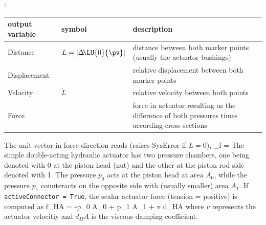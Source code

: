 :
\begin{center}
\footnotesize
\begin{longtable}{| p{5cm} | p{5cm} | p{6cm} |} 
\hline
\bf output variable & \bf symbol & \bf description \\ \hline
Distance & $L = |\Delta\! \LU{0}{\pv}|$ & distance between both marker points (usually the actuator bushings)\\ \hline
Displacement &  & relative displacement between both marker points\\ \hline
Velocity & $\dot L$ & relative velocity between both points\\ \hline
Force &  & force in actuator resulting as the difference of both pressures times according cross sections\\ \hline
\end{longtable}
\end{center}
 \noindent
    \finishTable
    \finishTable
    The unit vector in force direction reads (raises SysError if $L=0$),
    \be
      \vv_{f} =  \Delta\! 
    \ee
    The simple double-acting hydraulic actuator has two pressure chambers, one being denoted with 0 at the
    piston head (nut) and the other at the piston rod side denoted with 1. The pressure $p_0$ acts at the piston head at area $A_0$, 
    while the pressure $p_1$ counteracts on the opposite side with (usually smaller) area $A_1$.
    If \texttt{activeConnector = True}, the scalar actuator force (tension = positive) is computed as
    \be
      f_{HA} = -p_0 \cdot A_0 + p_1 \cdot A_1 + v \cdot d_HA
    \ee
    where $v$ represents the actuator velocitiy and $d_HA$ is the viscous damping coefficient.

